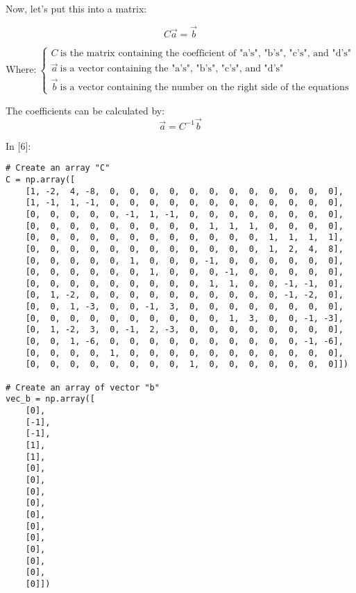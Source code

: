 \documentclass[11pt]{article}
\newif\ifcode
\newif\ifleftmargins
\newlength{\promptlength}
\newcommand{\prompt}[3]{
        \needspace{1.1cm}
        \settowidth{\promptlength}{ #1 [#3] }
        \ifleftmargins\hspace{-\promptlength}\hspace{-5pt}\fi
        {\color{#2}#1 [#3]:}
        \ifleftmargins\vspace{-2.7ex}\fi
    }
\begin{document}
    Now, let's put this into a matrix:

\[C \vec{a} = \vec{b}\]

\[\text{Where:} \ 
\left\{ \begin{array}{ll}
            C \ \text{is the matrix containing the coefficient of "a's", "b's", "c's", and "d's"}\\
            \vec{a} \ \text{is a vector containing the "a's", "b's", "c's", and "d's"}\\
            \vec{b} \ \text{is a vector containing the number on the right side of the equations}
            \end{array} \right.\]

    The coefficients can be calculated by: \[\vec{a} = C^{-1} \vec{b}\]

    
\prompt{In}{incolor}{6}
\codetrue
\begin{tcolorbox}[breakable, size=fbox, boxrule=1pt, pad at break*=1mm, colback=cellbackground, colframe=cellborder]
\begin{verbatim}
# Create an array "C"
C = np.array([
    [1, -2,  4, -8,  0,  0,  0,  0,  0,  0,  0,  0,  0,  0,  0,  0],
    [1, -1,  1, -1,  0,  0,  0,  0,  0,  0,  0,  0,  0,  0,  0,  0],
    [0,  0,  0,  0,  0, -1,  1, -1,  0,  0,  0,  0,  0,  0,  0,  0],
    [0,  0,  0,  0,  0,  0,  0,  0,  0,  1,  1,  1,  0,  0,  0,  0], 
    [0,  0,  0,  0,  0,  0,  0,  0,  0,  0,  0,  0,  1,  1,  1,  1], 
    [0,  0,  0,  0,  0,  0,  0,  0,  0,  0,  0,  0,  1,  2,  4,  8],  
    [0,  0,  0,  0,  0,  1,  0,  0,  0, -1,  0,  0,  0,  0,  0,  0], 
    [0,  0,  0,  0,  0,  0,  1,  0,  0,  0, -1,  0,  0,  0,  0,  0],  
    [0,  0,  0,  0,  0,  0,  0,  0,  0,  1,  1,  0,  0, -1, -1,  0], 
    [0,  1, -2,  0,  0,  0,  0,  0,  0,  0,  0,  0,  0, -1, -2,  0],
    [0,  0,  1, -3,  0,  0, -1,  3,  0,  0,  0,  0,  0,  0,  0,  0], 
    [0,  0,  0,  0,  0,  0,  0,  0,  0,  0,  1,  3,  0,  0, -1, -3], 
    [0,  1, -2,  3,  0, -1,  2, -3,  0,  0,  0,  0,  0,  0,  0,  0], 
    [0,  0,  1, -6,  0,  0,  0,  0,  0,  0,  0,  0,  0,  0, -1, -6], 
    [0,  0,  0,  0,  1,  0,  0,  0,  0,  0,  0,  0,  0,  0,  0,  0], 
    [0,  0,  0,  0,  0,  0,  0,  0,  1,  0,  0,  0,  0,  0,  0,  0]])

# Create an array of vector "b"
vec_b = np.array([
    [0],
    [-1],
    [-1],
    [1], 
    [1], 
    [0],  
    [0], 
    [0],  
    [0], 
    [0],
    [0], 
    [0], 
    [0], 
    [0], 
    [0], 
    [0]])
\end{verbatim}
\end{tcolorbox}
\codefalse
\end{document}
